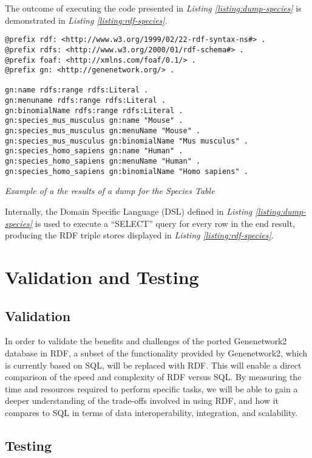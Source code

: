 The outcome of executing the code presented in \textit{Listing \ref{listing:dump-species}} is demonstrated in \textit{Listing \ref{listing:rdf-species}}.

\begin{listing}[H]
\begin{verbatim}
@prefix rdf: <http://www.w3.org/1999/02/22-rdf-syntax-ns#> .
@prefix rdfs: <http://www.w3.org/2000/01/rdf-schema#> .
@prefix foaf: <http://xmlns.com/foaf/0.1/> .
@prefix gn: <http://genenetwork.org/> .

gn:name rdfs:range rdfs:Literal .
gn:menuname rdfs:range rdfs:Literal .
gn:binomialName rdfs:range rdfs:Literal .
gn:species_mus_musculus gn:name "Mouse" .
gn:species_mus_musculus gn:menuName "Mouse" .
gn:species_mus_musculus gn:binomialName "Mus musculus" .
gn:species_homo_sapiens gn:name "Human" .
gn:species_homo_sapiens gn:menuName "Human" .
gn:species_homo_sapiens gn:binomialName "Homo sapiens" .
\end{verbatim}
\caption{\textit{Example of a the results of a dump for the Species Table}}
\label{listing:rdf-species}
\end{listing}

Internally, the Domain Specific Language (DSL) defined in \textit{Listing \ref{listing:dump-species}} is used to execute a ``SELECT'' query for every row in the end result, producing the RDF triple stores displayed in \textit{Listing \ref{listing:rdf-species}}.

\section{Validation and Testing}

\subsection{Validation}

In order to validate the benefits and challenges of the ported Genenetwork2 database in RDF, a subset of the functionality provided by Genenetwork2, which is currently based on SQL, will be replaced with RDF.  This will enable a direct comparison of the speed and complexity of RDF versus SQL.  By measuring the time and resources required to perform specific tasks, we will be able to gain a deeper understanding of the trade-offs involved in using RDF, and how it compares to SQL in terms of data interoperability, integration, and scalability.

\subsection{Testing}

